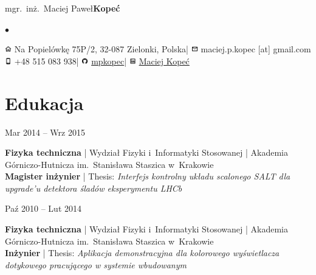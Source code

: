 \documentclass[11pt,a4paper,sans]{article}
\newcommand{\twhorline}[1]{\noindent\makebox[\linewidth]{\rule{\textwidth}{#1}}}
\newcommand{\cvedudateitem}[6]{

	\noindent
	\begin{minipage}[t]{0.22\linewidth}
		#1
	\end{minipage}
	\hfill
	\begin{minipage}[t]{0.76\linewidth}
		{\bfseries #2} | #3 | #4\\
		\textbf{#5} | Thesis: \emph{#6}
	\end{minipage}
	\vspace{1\baselineskip}

}
\newcommand{\firstname}{Maciej Paweł}
\newcommand{\familyname}{Kopeć}
\newcommand{\address}{Na Popielówkę 75P/2, 32-087 Zielonki, Polska}
\newcommand{\mobile}{+48 515 083 938}
\newcommand{\email}{maciej.p.kopec [at] gmail.com}
\newcommand{\github}{\href{https://github.com/mpkopec}{mpkopec}}
\newcommand{\linkedin}{\href{https://www.linkedin.com/in/maciej-kope\%C4\%87-46735595/}{Maciej Kopeć}}
\begin{document}
	\begin{center}
		{\Huge mgr.~inż.~\firstname \space \bfseries \familyname \normalfont}
		\vspace{1\baselineskip}

		\large
		\renewcommand*{\do}[1]{$\bullet$ #1 }
		$\bullet$
		\vspace{0.2\baselineskip}
		\twhorline{1pt}

		\vspace{0.25\baselineskip}
		\includegraphics[height=0.8em]{img/icons8-home-96.png}
		\address \space |
		\includegraphics[height=0.8em]{img/icons8-envelope-96.png}
		\email \\

		\includegraphics[height=0.8em]{img/icons8-iphone-96.png}
		\mobile \space |
		\includegraphics[height=0.8em]{img/icons8-github-96.png}
		\github \space |
		\includegraphics[height=0.8em]{img/icons8-linkedin-96.png}
		\linkedin

		\twhorline{1pt}

	\end{center}

	\section{Edukacja}
	\cvedudateitem
		{Mar 2014 -- Wrz 2015}
		{Fizyka techniczna}
		{Wydział Fizyki i~Informatyki Stosowanej}
		{Akademia Górniczo-Hutnicza im.~Stanisława Staszica w~Krakowie}
		{Magister inżynier}
		{Interfejs kontrolny układu scalonego SALT dla upgrade'u detektora śladów eksperymentu LHCb}
	\cvedudateitem
		{Paź 2010 -- Lut 2014}
		{Fizyka techniczna}
		{Wydział Fizyki i~Informatyki Stosowanej}
		{Akademia Górniczo-Hutnicza im.~Stanisława Staszica w~Krakowie}
		{Inżynier}
		{Aplikacja demonstracyjna dla kolorowego wyświetlacza dotykowego pracującego w systemie wbudowanym}
\end{document}
